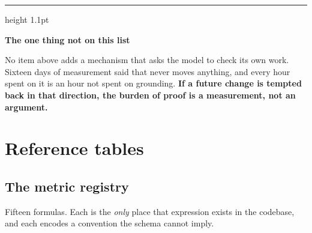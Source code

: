 \documentclass[11pt,a4paper]{report}
\newenvironment{keybox}[1]
 {\par\medskip\begin{center}\begin{minipage}{0.94\textwidth}%
  {\color{navy}\hrule height 1.1pt}\vspace{5pt}\par
  \textbf{\color{navy}#1}\par\vspace{3pt}\small}
 {\par\vspace{5pt}{\color{mist}\hrule height 0.8pt}\end{minipage}\end{center}\medskip}
\begin{document}
\begin{keybox}{The one thing not on this list}
No item above adds a mechanism that asks the model to check its own work. Sixteen days of
measurement said that never moves anything, and every hour spent on it is an hour not spent on
grounding. \textbf{If a future change is tempted back in that direction, the burden of proof is a
measurement, not an argument.}
\end{keybox}

\appendix

\chapter{Reference tables}

\section{The metric registry}

Fifteen formulas. Each is the \emph{only} place that expression exists in the codebase, and each
encodes a convention the schema cannot imply.
\end{document}
